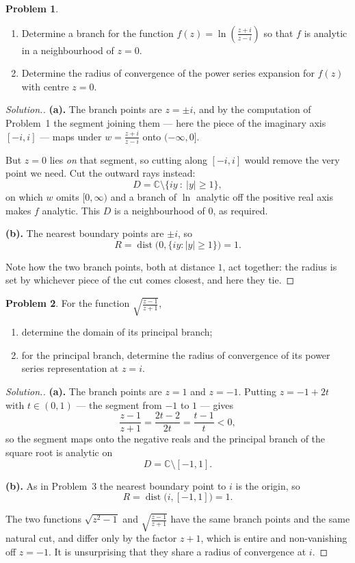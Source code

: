 \documentclass[11pt,a4paper]{article}
\theoremstyle{definition}
\newtheorem{problemx}{Problem}[section]
\newenvironment{problem}{\begin{problemx}}{\end{problemx}}
\newenvironment{solution}
  {\renewcommand{\qedsymbol}{}\begin{proof}[\textit{Solution}.]}
  {\end{proof}}
\begin{document}
\begin{problem}
\begin{enumerate}
\item[(a).] Determine a branch for the function
$f(z) = \ln\left(\frac{z + i}{z - i}\right)$ so that $f$ is analytic in a
neighbourhood of $z = 0$.
\item[(b).] Determine the radius of convergence of the power series expansion for
$f(z)$ with centre $z = 0$.
\end{enumerate}
\end{problem}

\begin{solution}
\textbf{(a).} The branch points are $z = \pm i$, and by the computation of
Problem~1 the segment joining them --- here the piece of the imaginary axis
$[-i, i]$ --- maps under $w = \frac{z+i}{z-i}$ onto $(-\infty, 0]$.

But $z = 0$ lies \emph{on} that segment, so cutting along $[-i,i]$ would remove
the very point we need. Cut the outward rays instead:
$$D = \mathbb{C} \setminus \{iy \ :\ \left|y\right| \geq 1\},$$
on which $w$ omits $[0,\infty)$ and a branch of $\ln$ analytic off the positive
real axis makes $f$ analytic. This $D$ is a neighbourhood of $0$, as required.

\textbf{(b).} The nearest boundary points are $\pm i$, so
$$R = \operatorname{dist}\big(0, \{iy : \left|y\right| \geq 1\}\big) = 1 .$$

Note how the two branch points, both at distance $1$, act together: the radius is
set by whichever piece of the cut comes closest, and here they tie.
\end{solution}


\begin{problem}
For the function $\sqrt{\frac{z - 1}{z + 1}}$,
\begin{enumerate}
\item[(a).] determine the domain of its principal branch;
\item[(b).] for the principal branch, determine the radius of convergence of its
power series representation at $z = i$.
\end{enumerate}
\end{problem}

\begin{solution}
\textbf{(a).} The branch points are $z = 1$ and $z = -1$. Putting
$z = -1 + 2t$ with $t \in (0,1)$ --- the segment from $-1$ to $1$ --- gives
$$\frac{z-1}{z+1} = \frac{2t-2}{2t} = \frac{t-1}{t} < 0 ,$$
so the segment maps onto the negative reals and the principal branch of the
square root is analytic on
$$D = \mathbb{C}\setminus[-1,1].$$

\textbf{(b).} As in Problem~3 the nearest boundary point to $i$ is the origin,
so
$$R = \operatorname{dist}\big(i,[-1,1]\big) = 1 .$$

The two functions $\sqrt{z^2-1}$ and $\sqrt{\frac{z-1}{z+1}}$ have the same branch
points and the same natural cut, and differ only by the factor $z+1$, which is
entire and non-vanishing off $z=-1$. It is unsurprising that they share a radius
of convergence at $i$.
\end{solution}
\end{document}
